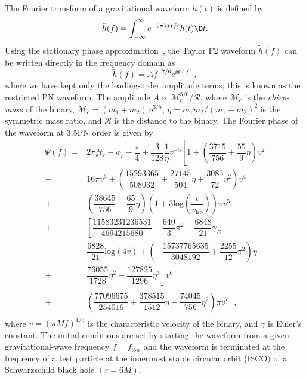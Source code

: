 The Fourier transform of a gravitational waveform $h(t)$
is defined by
\begin{equation}
\tilde{h}(f) = \int^{\infty}_{-\infty}e^{-2\pi \ii ft}h(t)\D t.
\end{equation}
Using the stationary phase approximation~\citep{MatthewsWalker}, the Taylor F2
waveform $\tilde{h}(f)$ can be written  directly in the frequency domain as
\begin{equation}\label{eq:hfSPA}
\tilde{h}(f) = Af^{-7/6}e^{ \ii \Psi(f)},
\end{equation}
where we have kept only the leading-order amplitude terms; this is known as
the restricted PN waveform. The amplitude $A\propto \mathcal{M}_c^{5/6}/\mathcal{R}$, 
where $\mathcal{M}_c$ is the \textit{chirp-mass} of the binary, 
$\mathcal{M}_c = (m_1+m_2)\,\eta^{3/5}$, $\eta=m_1m_2/(m_1+m_2)^2$ is the symmetric mass ratio, and $\mathcal{R}$ is the distance to
the binary. The Fourier phase of the waveform at 3.5PN order is given by~\citep{Sathyaprakash:1991mt,Cutler:1994ys,GW2PN,Blanchet:2001ax,Blanchet:2004ek,Poisson:1995ef,Allen:2005fk}
\begin{equation}
\begin{split}\label{eq:PsiSPA}
\Psi(f)=&2\pi ft_c-\phi_c-\dfrac{\pi}{4} + \dfrac{3}{128}\dfrac{1}{\eta}v^{-5}\left[1 + \left(\dfrac{3715}{756} +\dfrac{55}{9}\eta\right)v^2\right.\\
-&\left. 16\pi v^3+\left(\dfrac{15293365}{508032}+\dfrac{27145}{504}\eta +\dfrac{3085}{72}\eta^2 \right)v^4\right.\\
+&\left.\left(\dfrac{38645}{756}-\dfrac{65}{9}\eta\right)\left(1+3\textrm{log}\left(\dfrac{v}{v_{\textrm{lso}}}\right)\right)\pi v^5\right.\\
+&\left.\left[\dfrac{11583231236531}{4694215680}-\dfrac{640}{3}\pi^2 -\dfrac{6848}{21}\gamma_E\right.\right.\\
-&\left.\left. \dfrac{6828}{21}\textrm{log}(4v)+\left(-\dfrac{15737765635}{3048192}+\dfrac{2255}{12}\pi^2 \right)\eta\right.\right.\\
+&\left.\left.\dfrac{76055}{1728}\eta^2 -\dfrac{127825}{1296}\eta^3\right] v^6\right.\\
+&\left.\left(\dfrac{77096675}{254016}+\dfrac{378515}{1512}\eta -\dfrac{74045}{756}\eta^2 \right)\pi v^7\right],
\end{split}
\end{equation}
where  $v=(\pi
Mf)^{1/3}$ is the characteristic velocity of the binary, and $\gamma$ is
Euler's constant.  The initial conditions are set by starting the waveform
from a given gravitational-wave frequency $f=f_{\mathrm{low}}$ and the
waveform is terminated at the frequency of a test particle at the innermost
stable circular orbit (ISCO) of a Schwarzschild black hole $(r = 6M)$.


